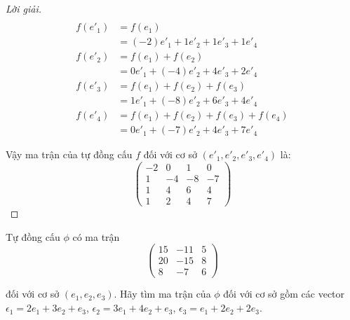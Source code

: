 \documentclass[class=linearalgebra,crop=false]{standalone}
\begin{document}
\begin{proof}[Lời giải]
\begin{align*}
    \end{align*}
    \begin{align*}
        f(e'_{1}) & = f(e_{1}) \\
                  & = (-2)e'_{1} + 1e'_{2} + 1e'_{3} + 1e'_{4} \\
        f(e'_{2}) & = f(e_{1}) + f(e_{2}) \\
                  & = 0e'_{1} + (-4)e'_{2} + 4e'_{3} + 2e'_{4} \\
        f(e'_{3}) & = f(e_{1}) + f(e_{2}) + f(e_{3}) \\
                  & = 1e'_{1} + (-8)e'_{2} + 6e'_{3} + 4e'_{4} \\
        f(e'_{4}) & = f(e_{1}) + f(e_{2}) + f(e_{3}) + f(e_{4}) \\
                  & = 0e'_{1} + (-7)e'_{2} + 4e'_{3} + 7e'_{4}
    \end{align*}
    \par Vậy ma trận của tự đồng cấu $f$ đối với cơ sở $(e'_{1}, e'_{2}, e'_{3}, e'_{4})$ là:
    \[
        \begin{pmatrix}
            -2 & 0  & 1  & 0  \\
            1  & -4 & -8 & -7 \\
            1  & 4  & 6  & 4  \\
            1  & 2  & 4  & 7
        \end{pmatrix}
    \]
\end{proof}

\begin{exercise}
    Tự đồng cấu $\phi$ có ma trận
    \[
        \begin{pmatrix}
            15 & -11 & 5 \\
            20 & -15 & 8 \\
            8  & -7  & 6
        \end{pmatrix}
    \]
    \par đối với cơ sở $(e_{1}, e_{2}, e_{3})$. Hãy tìm ma trận của $\phi$ đối với cơ sở gồm các vector $\epsilon_{1} = 2e_{1} + 3e_{2} + e_{3}$, $\epsilon_{2} = 3e_{1} + 4e_{2} + e_{3}$, $\epsilon_{3} = e_{1} + 2e_{2} + 2e_{3}$.
\end{exercise}
\end{document}

